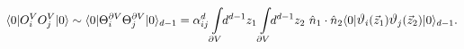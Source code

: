 \begin{equation}
\label{boundary4}
    \langle 0|O_i^{V}O_j^{V}|0\rangle \sim
    \langle 0|\Theta_i^{\partial V}\Theta_j^{\partial V}|0\rangle_{d-1}= 
    \alpha^d_{ij} \int\limits_{\partial V}\!\! d^{d-1} z_1
    \int\limits_{\partial V}\!\! d^{d-1} z_2~\hat n_1 \cdot\hat n_2
        \langle 0|\hbox{\large$\vartheta$}_i(\vec{z}_1)
        \hbox{\large$\vartheta$}_j(\vec{z}_2)|0\rangle_{d-1}.
\end{equation}

